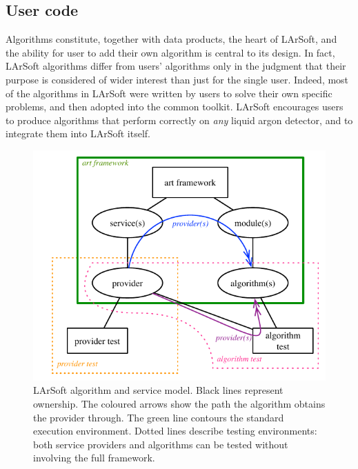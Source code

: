 \subsection{User code}
\label{ssec:Development:UserCode}

Algorithms constitute, together with data products, the heart of LArSoft,
and the ability for user to add their own algorithm is central to its design.
In fact, LArSoft algorithms differ from users' algorithms
only in the judgment that their purpose is considered of wider interest
than just for the single user.
Indeed, most of the algorithms in LArSoft were written by users to solve their own specific problems,
and then adopted into the common toolkit.
LArSoft encourages users to produce algorithms that perform correctly on \emph{any} liquid argon detector,
and to integrate them into LArSoft itself.

\begin{figure}
   \centering
   \includegraphics{figures/LArSoftFactorizationModelAndTests.pdf}
   \caption{\label{fig:AlgorithmModel}LArSoft algorithm and service model.
      Black lines represent ownership.
      The coloured arrows show the path the algorithm obtains the provider through.
      The green line contours the standard execution environment.
      Dotted lines describe testing environments:
      both service providers and algorithms can be tested without involving the full framework.
   }
\end{figure}

